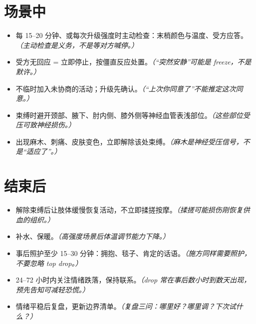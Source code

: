 \documentclass[12pt,UTF8]{ctexbook}
\begin{document}
\section{场景中}

\begin{itemize}
\item[$\square$] 每 15--20 分钟、或每次升级强度时主动检查：末梢颜色与温度、受方应答。\textit{（主动检查是义务，不是等对方喊停。）}
\item[$\square$] 受方无回应 = 立即停止，按僵直反应处置。\textit{（“突然安静”可能是 freeze，不是默许。）}
\item[$\square$] 不临时加入未协商的活动；升级先确认。\textit{（“上次你同意了”不能推定这次同意。）}
\item[$\square$] 束缚时避开颈部、腋下、肘内侧、膝外侧等神经血管表浅部位。\textit{（这些部位受压可致神经损伤。）}
\item[$\square$] 出现麻木、刺痛、皮肤变色，立即解除该处束缚。\textit{（麻木是神经受压信号，不是“适应了”。）}
\end{itemize}

\section{结束后}

\begin{itemize}
\item[$\square$] 解除束缚后让肢体缓慢恢复活动，不立即揉搓按摩。\textit{（揉搓可能损伤刚恢复供血的组织。）}
\item[$\square$] 补水、保暖。\textit{（高强度场景后体温调节能力下降。）}
\item[$\square$] 事后照护至少 15--30 分钟：拥抱、毯子、肯定的话语。\textit{（施方同样需要照护，不要忽略 top drop。）}
\item[$\square$] 24--72 小时内关注情绪跌落，保持联系。\textit{（drop 常在事后数小时到数天出现，预先告知可减轻恐慌。）}
\item[$\square$] 情绪平稳后复盘，更新边界清单。\textit{（复盘三问：哪里好？哪里调？下次试什么？）}
\end{itemize}




\printindex
\end{document}
